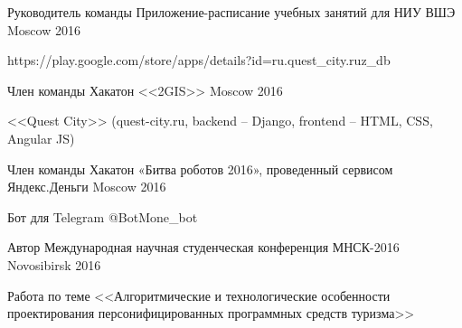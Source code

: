 


\begin{cventries}


\cventry
{Руководитель команды} %
{Приложение-расписание учебных занятий для НИУ ВШЭ} %
{Moscow} %
{2016} %
{ %
	\begin{cvitems}
		\item {https://play.google.com/store/apps/details?id=ru.quest\_city.ruz\_db}
	\end{cvitems}
}



\cventry
{Член команды} %
{Хакатон <<2GIS>>} %
{Moscow} %
{2016} %
{ %
\begin{cvitems}
\item {<<Quest City>> (quest-city.ru, backend – Django, frontend – HTML, CSS, Angular JS)}
\end{cvitems}
}


\cventry
{Член команды} %
{Хакатон «Битва роботов 2016», проведенный сервисом Яндекс.Деньги} %
{Moscow} %
{2016} %
{ %
\begin{cvitems}
\item {Бот для Telegram @BotMone\_bot}
\end{cvitems}
}


\cventry
{Автор} %
{Международная научная студенческая конференция МНСК-2016} %
{Novosibirsk} %
{2016} %
{ %
\begin{cvitems}
\item {Работа по теме <<Алгоритмические и технологические особенности проектирования персонифицированных программных средств туризма>>}
\end{cvitems}
}


\end{cventries}
